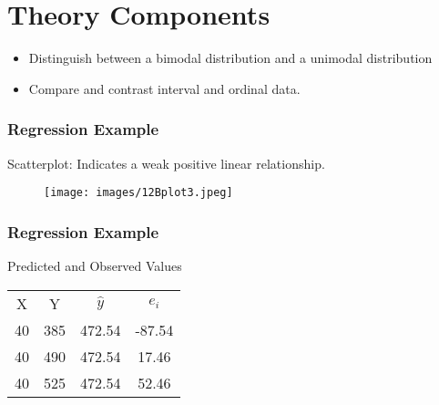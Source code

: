 \documentclass[]{report}
\begin{document}
			
			\section*{Theory Components}
			\begin{itemize}
				\item Distinguish between a bimodal distribution and a unimodal distribution
				\item Compare and contrast interval and ordinal data.
			\end{itemize}







\subsubsection{Regression Example}
Scatterplot: Indicates a weak positive linear relationship.
\begin{center}
	\begin{figure}
		\texttt{[image: images/12Bplot3.jpeg]}\\
	\end{figure}
\end{center}



\subsubsection{Regression Example}

Predicted and Observed Values

\begin{center}
	\begin{tabular}{|c|c|c|c|}
		\hline
		X & Y& $\hat{y}$ & $e_i$ \\
		40 &385 &472.54 &-87.54\\
		40 &490 &472.54 & 17.46\\
		40 &525 &472.54 & 52.46\\
		\hline
	\end{tabular}
\end{center}


			
\end{document}
